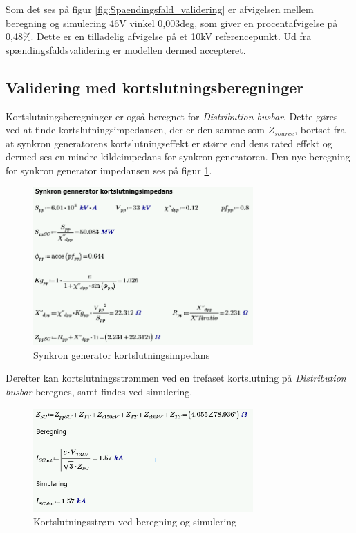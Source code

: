  Som det ses på figur \ref{fig:Spaendingsfald_validering} er afvigelsen mellem beregning og simulering 46V vinkel 0,003deg, som giver en procentafvigelse på 0,48\%. Dette er en tilladelig afvigelse på et 10kV referencepunkt. Ud fra spændingsfaldsvalidering er modellen dermed accepteret.
 
\subsection{Validering med kortslutningsberegninger}
Kortslutningsberegninger er også beregnet for \textit{Distribution busbar}. Dette gøres ved at finde kortslutningsimpedansen, der er den samme som $Z_{source}$, bortset fra at synkron generatorens kortslutningseffekt er større end dens rated effekt og dermed ses en mindre kildeimpedans for synkron generatoren. Den nye beregning for synkron generator impedansen ses på figur \ref{fig:SGimpedansSC}.

\begin{figure}[H] %
	\centering
	\includegraphics[width=0.75\textwidth]{figurer/Synkron_generator_valideringSC}
	\caption{Synkron generator kortslutningsimpedans}
	\label{fig:SGimpedansSC}
\end{figure}

Derefter kan kortslutningsstrømmen ved en trefaset kortslutning på \textit{Distribution busbar} beregnes, samt findes ved simulering.

\begin{figure}[H] %
	\centering
	\includegraphics[width=0.75\textwidth]{figurer/Kortslutningsstroem_validering}
	\caption{Kortslutningsstrøm ved beregning og simulering}
	\label{fig:SCvalidering}
\end{figure}

